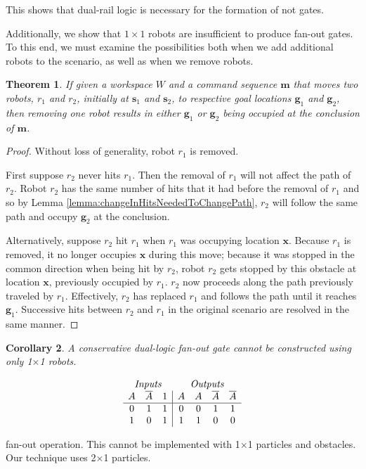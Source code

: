 \documentclass[letterpaper, 10 pt, conference]{ieeeconf}
\newtheorem{theorem}{Theorem}
\newtheorem{corollary}[theorem]{Corollary}
\begin{document}
This shows that dual-rail logic is necessary for the formation of {\sc not} gates. 

Additionally, we show that $1\times1$ robots are insufficient to produce fan-out gates. To this end, we must examine the possibilities both when we add additional robots to the scenario, as well as when we remove robots.  

\begin{theorem}\label{thm:TwoRobotsTwoGoalsImpliesOneRobotOneGoal} 
If given a workspace $W$ and a command sequence $\bm{m}$ that moves two robots, $r_1$ and $r_2$, initially at $\bm{s}_1$ and $\bm{s}_2$, to respective goal locations $\bm{g}_1$ and $\bm{g}_2$, then removing one robot results in either $\bm{g}_1$ or $\bm{g}_2$ being occupied at the conclusion of $\bm{m}$.
\end{theorem}

\begin{proof} 
Without loss of generality, robot $r_1$ is removed. 

First suppose $r_2$ never hits $r_1$. Then the removal of $r_1$ will not affect the path of $r_2$. Robot $r_2$ has the same number of hits that it had before the removal of $r_1$ and so by Lemma \ref{lemma:changeInHitsNeededToChangePath}, $r_2$ will follow the same path and occupy $\bm{g}_2$ at the conclusion. 

Alternatively, suppose $r_2$ hit $r_1$ when $r_1$ was occupying location $\bm{x}$. Because $r_1$ is removed, it no longer occupies $\bm{x}$ during this move; because it was stopped in the common direction when being hit by $r_2$, robot $r_2$ gets stopped by this obstacle at location $\bm{x}$, previously occupied by $r_1$. $r_2$ now proceeds along the path previously traveled by $r_1$. Effectively, $r_2$ has replaced $r_1$ and follows the path until it reaches $\bm{g}_1$. Successive hits between $r_2$ and $r_1$ in the original scenario are resolved in the same manner.
\end{proof}

\begin{corollary}\label{cor:No1x1FanOut}
A  conservative dual-logic {\sc fan-out} gate cannot be constructed using only 1$\times$1 robots.
\end{corollary}

  \begin{table}
\begin{displaymath}
\begin{array}{ccc|cccc}
\multicolumn{3}{c}{\emph{Inputs}} & \multicolumn{4}{c}{\emph{Outputs}} \\
   A & \overline{A} & 1 & A & A &  \overline{A} & \overline{A}\\
\hline
0 & 1 & 1 & 0 & 0 & 1 & 1  \\
1 & 0 & 1 & 1 & 1 & 0 & 0  \\
\end{array}
\end{displaymath}
\caption{{\sc fan-out} operation. This cannot be implemented with 1$\times$1 particles and obstacles. Our technique uses 2$\times$1 particles. }
  \label{tab:Fanout}
\end{table}
\end{document}
